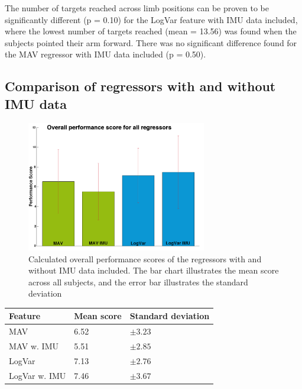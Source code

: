 The number of targets reached across limb positions can be proven to be significantly different (p = 0.10) for the LogVar feature with IMU data included, where the lowest number of targets reached (mean = 13.56) was found when the subjects pointed their arm forward. There was no significant difference found for the MAV regressor with IMU data included (p = 0.50).
	
\subsection{Comparison of regressors with and without IMU data}

\begin{figure}[H]
	\includegraphics[width=0.7\textwidth]{figures/results/allRegressorBarzTimeScoreForTargetTest}  %
	\caption{Calculated overall performance scores of the regressors with and without IMU data included. The bar chart illustrates the mean score across all subjects, and the error bar illustrates the standard deviation}
	\label{fig:gotItTimeOverall}  %
\end{figure}

\begin{center}
	\begin{tabular}{l l l}
		\toprule
		\textbf{Feature} & \textbf{Mean score} & \textbf{Standard deviation}\\
		\midrule
		MAV & 6.52 & $\pm 3.23$ \\
		MAV w. IMU & 5.51 & $\pm 2.85$ \\
		LogVar & 7.13 & $\pm 2.76$ \\
		LogVar w. IMU & 7.46 & $\pm 3.67$ \\
		\bottomrule
	\end{tabular}
\end{center}


